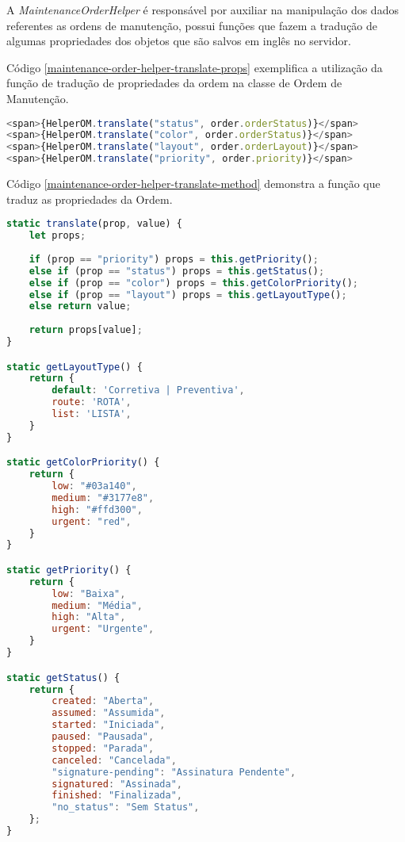A \textit{MaintenanceOrderHelper} é responsável por auxiliar na manipulação dos dados referentes as ordens de manutenção, possui funções que fazem a tradução de algumas propriedades dos objetos que são salvos em inglês no servidor.

Código \ref{maintenance-order-helper-translate-props} exemplifica a utilização da função de tradução de propriedades da ordem na classe de Ordem de Manutenção.

\begin{lstlisting}[language=JavaScript, caption={Utilizando a tradução de propriedades da ordem de manutenção}, label={maintenance-order-helper-translate-props}]
<span>{HelperOM.translate("status", order.orderStatus)}</span>
<span>{HelperOM.translate("color", order.orderStatus)}</span>
<span>{HelperOM.translate("layout", order.orderLayout)}</span>
<span>{HelperOM.translate("priority", order.priority)}</span>
\end{lstlisting}

Código \ref{maintenance-order-helper-translate-method} demonstra a função que traduz as propriedades da Ordem.

\begin{lstlisting}[language=JavaScript, caption={Função de tradução}, label={maintenance-order-helper-translate-method}]
static translate(prop, value) {
	let props;
	
	if (prop == "priority") props = this.getPriority();
	else if (prop == "status") props = this.getStatus();
	else if (prop == "color") props = this.getColorPriority();
	else if (prop == "layout") props = this.getLayoutType();
	else return value;
	
	return props[value];
}

static getLayoutType() {
	return {
		default: 'Corretiva | Preventiva',
		route: 'ROTA',
		list: 'LISTA',
	}
}

static getColorPriority() {
	return {
		low: "#03a140",
		medium: "#3177e8",
		high: "#ffd300",
		urgent: "red",
	}
}

static getPriority() {
	return {
		low: "Baixa",
		medium: "Média",
		high: "Alta",
		urgent: "Urgente",
	}
}

static getStatus() {
	return {
		created: "Aberta",
		assumed: "Assumida",
		started: "Iniciada",
		paused: "Pausada",
		stopped: "Parada",
		canceled: "Cancelada",
		"signature-pending": "Assinatura Pendente",
		signatured: "Assinada",
		finished: "Finalizada",
		"no_status": "Sem Status",
	};
}
\end{lstlisting}

